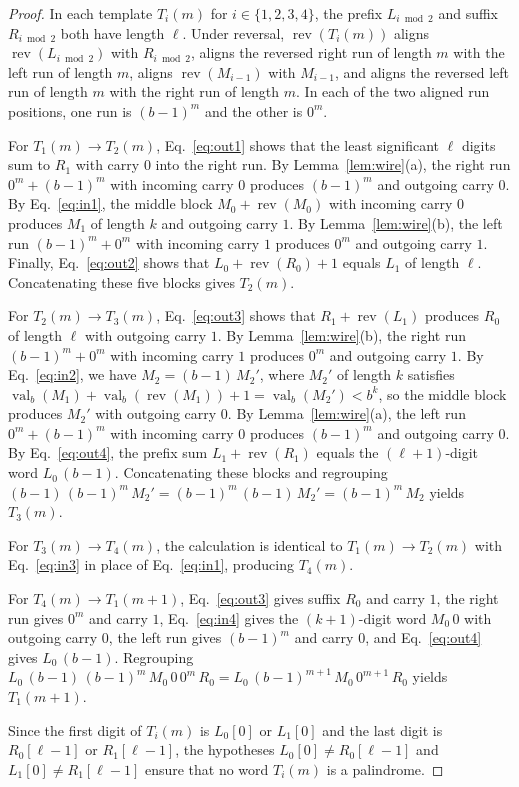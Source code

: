 \documentclass[12pt,reqno]{article}
\DeclareMathOperator{\Rev}{rev}
\DeclareMathOperator{\val}{val}
\begin{document}
\begin{proof}
In each template $T_i(m)$ for $i \in \{1, 2, 3, 4\}$, the prefix $L_{i \bmod 2}$ and suffix $R_{i \bmod 2}$ both have length $\ell$. Under reversal, $\Rev(T_i(m))$ aligns $\Rev(L_{i \bmod 2})$ with $R_{i \bmod 2}$, aligns the reversed right run of length $m$ with the left run of length $m$, aligns $\Rev(M_{i-1})$ with $M_{i-1}$, and aligns the reversed left run of length $m$ with the right run of length $m$. In each of the two aligned run positions, one run is $(b-1)^m$ and the other is $0^m$.

For $T_1(m) \to T_2(m)$, Eq.~\eqref{eq:out1} shows that the least significant $\ell$ digits sum to $R_1$ with carry $0$ into the right run. By Lemma~\ref{lem:wire}(a), the right run $0^m + (b-1)^m$ with incoming carry $0$ produces $(b-1)^m$ and outgoing carry $0$. By Eq.~\eqref{eq:in1}, the middle block $M_0 + \Rev(M_0)$ with incoming carry $0$ produces $M_1$ of length $k$ and outgoing carry $1$. By Lemma~\ref{lem:wire}(b), the left run $(b-1)^m + 0^m$ with incoming carry $1$ produces $0^m$ and outgoing carry $1$. Finally, Eq.~\eqref{eq:out2} shows that $L_0 + \Rev(R_0) + 1$ equals $L_1$ of length $\ell$. Concatenating these five blocks gives $T_2(m)$.

For $T_2(m) \to T_3(m)$, Eq.~\eqref{eq:out3} shows that $R_1 + \Rev(L_1)$ produces $R_0$ of length $\ell$ with outgoing carry $1$. By Lemma~\ref{lem:wire}(b), the right run $(b-1)^m + 0^m$ with incoming carry $1$ produces $0^m$ and outgoing carry $1$. By Eq.~\eqref{eq:in2}, we have $M_2 = (b-1) \, M_2'$, where $M_2'$ of length $k$ satisfies $\val_b(M_1) + \val_b(\Rev(M_1)) + 1 = \val_b(M_2') < b^k$, so the middle block produces $M_2'$ with outgoing carry $0$. By Lemma~\ref{lem:wire}(a), the left run $0^m + (b-1)^m$ with incoming carry $0$ produces $(b-1)^m$ and outgoing carry $0$. By Eq.~\eqref{eq:out4}, the prefix sum $L_1 + \Rev(R_1)$ equals the $(\ell+1)$-digit word $L_0 \, (b-1)$. Concatenating these blocks and regrouping $(b-1) \, (b-1)^m \, M_2' = (b-1)^m \, (b-1) \, M_2' = (b-1)^m \, M_2$ yields $T_3(m)$.

For $T_3(m) \to T_4(m)$, the calculation is identical to $T_1(m) \to T_2(m)$ with Eq.~\eqref{eq:in3} in place of Eq.~\eqref{eq:in1}, producing $T_4(m)$.

For $T_4(m) \to T_1(m+1)$, Eq.~\eqref{eq:out3} gives suffix $R_0$ and carry $1$, the right run gives $0^m$ and carry $1$, Eq.~\eqref{eq:in4} gives the $(k+1)$-digit word $M_0 \, 0$ with outgoing carry $0$, the left run gives $(b-1)^m$ and carry $0$, and Eq.~\eqref{eq:out4} gives $L_0 \, (b-1)$. Regrouping $L_0 \, (b-1) \, (b-1)^m \, M_0 \, 0 \, 0^m \, R_0 = L_0 \, (b-1)^{m+1} \, M_0 \, 0^{m+1} \, R_0$ yields $T_1(m+1)$.

Since the first digit of $T_i(m)$ is $L_0[0]$ or $L_1[0]$ and the last digit is $R_0[\ell-1]$ or $R_1[\ell-1]$, the hypotheses $L_0[0] \neq R_0[\ell-1]$ and $L_1[0] \neq R_1[\ell-1]$ ensure that no word $T_i(m)$ is a palindrome.
\end{proof}
\end{document}
